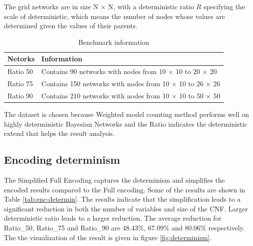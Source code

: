 \noindent The grid networks are in size N $\times$ N, with a deterministic ratio $R$ specifying the scale of deterministic, which means the number of nodes whose values are determined given the values of their parents. \\

\begin{table}[]
    \centering
    \begin{tabular}{l p{5cm}}
    \hline
    Netorks	&	Information	\\
    \hline
    \hline
    Ratio 50	&	Contains 90 networks with nodes from 10 $\times$ 10 to  20 $\times$ 20 	\\
    \hline
    Ratio 75	&	Contains 150 networks with nodes from 10 $\times$ 10 to  26 $\times$ 26 	\\
    \hline
    Ratio 90	&	Contains 210 networks with nodes from 10 $\times$ 10 to  50 $\times$ 50  \\
    \hline
    \end{tabular}
    \caption{Benchmark information}
    \label{tab:benchmark_info}
\end{table}


\noindent The dataset is chosen because Weighted model counting method performs well on highly deterministic Bayesian Networks and the Ratio indicates the deterministic extend that helps the result analysis.

\subsection{Encoding determinism}
The Simplified Full Encoding captures the determinism and simplifies the encoded results compared to the Full encoding. Some of the results are shown in Table \ref{tab:enc-determin}. The results indicate that the simplification leads to a significant reduction in both the number of variables and size of the CNF. Larger deterministic ratio leads to a larger reduction. The average reduction for Ratio\_50, Ratio\_75 and Ratio\_90 are 48.43\%, 67.09\% and 80.06\% respectively. The the visualization of the result is given in figure \ref{fig:determinism}.

